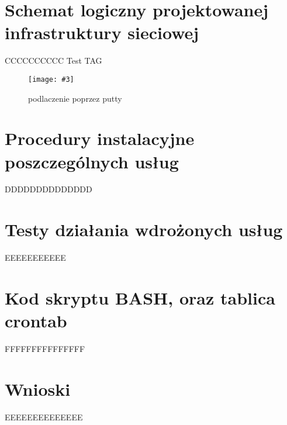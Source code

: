 \documentclass[a4paper]{article}
\newcommand*{\fg}[4][!htb]{
      \begin{figure*}[#1]
      \texttt{[image: \#3]}
      \caption{#4}
      \end{figure*}
}
\begin{document}
\section{Schemat logiczny projektowanej infrastruktury sieciowej}
CCCCCCCCCC
Test TAG
\fg{width=\textwidth}{contents/configuration/SSH/2.png}{podlaczenie poprzez putty}
\section{Procedury instalacyjne poszczególnych usług}
DDDDDDDDDDDDDD
\section{Testy działania wdrożonych usług}
EEEEEEEEEEE
\section{Kod skryptu BASH, oraz tablica crontab}
FFFFFFFFFFFFFFF
\section{Wnioski}
EEEEEEEEEEEEEE
\newpage
\nocite{k8s-docs}
\nocite{k8s-blog}
\nocite{k8s-github}
\printbibliography[heading=bibnumbered, label=Literatura, title=Literatura]
\end{document}
